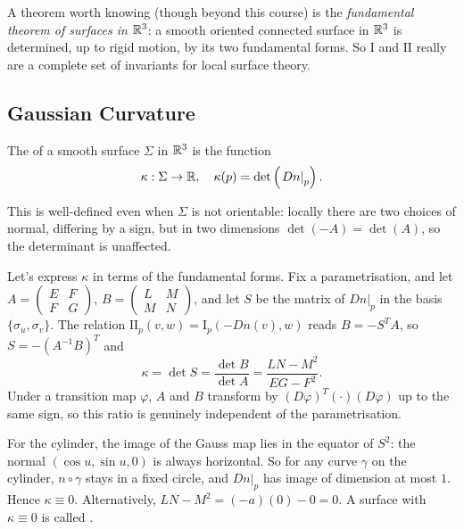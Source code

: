 \documentclass[a4paper]{scrartcl}
\begin{document}
\begin{remark}
    A theorem worth knowing (though beyond this course) is the \emph{fundamental theorem of surfaces in $\mathbb{R}^3$}: a smooth oriented connected surface in $\mathbb{R}^3$ is determined, up to rigid motion, by its two fundamental forms. So $\mathrm{I}$ and $\mathrm{II}$ really are a complete set of invariants for local surface theory.
\end{remark}

\subsection{Gaussian Curvature}

\begin{definition}
    The  of a smooth surface $\Sigma$ in $\mathbb{R}^3$ is the function
    $$
    \kappa : \Sigma \rightarrow \mathbb{R}, \quad \kappa(p) = \det\left(\left.Dn\right|_p\right).
    $$
\end{definition}

\begin{remark}
    This is well-defined even when $\Sigma$ is not orientable: locally there are two choices of normal, differing by a sign, but in two dimensions $\det(-A) = \det(A)$, so the determinant is unaffected.
\end{remark}

Let's express $\kappa$ in terms of the fundamental forms. Fix a parametrisation, and let $A = \begin{pmatrix} E & F \\ F & G\end{pmatrix}$, $B = \begin{pmatrix} L & M \\ M & N \end{pmatrix}$, and let $S$ be the matrix of $\left.Dn\right|_p$ in the basis $\{\sigma_u, \sigma_v\}$. The relation $\mathrm{II}_p(v, w) = \mathrm{I}_p(-Dn(v), w)$ reads $B = -S^T A$, so $S = -(A^{-1}B)^T$ and
$$
\kappa = \det S = \frac{\det B}{\det A} = \frac{LN - M^2}{EG - F^2}.
$$
Under a transition map $\varphi$, $A$ and $B$ transform by $(D\varphi)^T(\cdot)(D\varphi)$ up to the same sign, so this ratio is genuinely independent of the parametrisation.

\begin{example}
    For the cylinder, the image of the Gauss map lies in the equator of $S^2$: the normal $(\cos u, \sin u, 0)$ is always horizontal. So for any curve $\gamma$ on the cylinder, $n \circ \gamma$ stays in a fixed circle, and $\left.Dn\right|_p$ has image of dimension at most $1$. Hence $\kappa \equiv 0$. Alternatively, $LN - M^2 = (-a)(0) - 0 = 0$. A surface with $\kappa \equiv 0$ is called .
\end{example}
\end{document}

